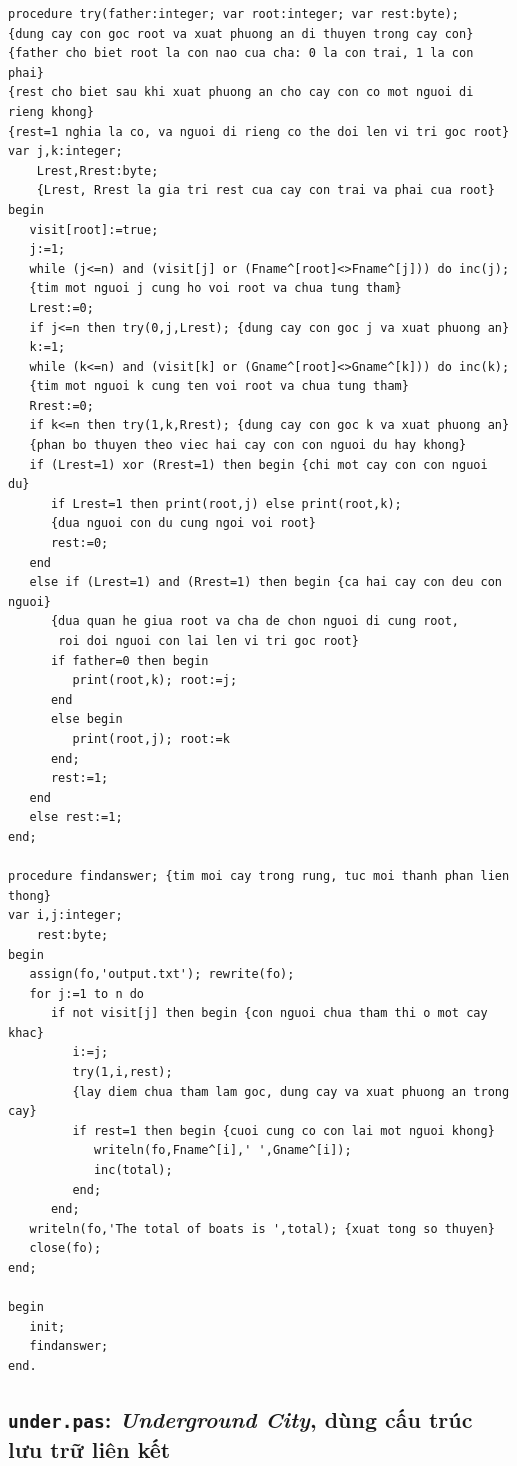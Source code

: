 \documentclass[11pt]{article}
\begin{document}
\begin{verbatim}
procedure try(father:integer; var root:integer; var rest:byte);
{dung cay con goc root va xuat phuong an di thuyen trong cay con}
{father cho biet root la con nao cua cha: 0 la con trai, 1 la con phai}
{rest cho biet sau khi xuat phuong an cho cay con co mot nguoi di rieng khong}
{rest=1 nghia la co, va nguoi di rieng co the doi len vi tri goc root}
var j,k:integer;
    Lrest,Rrest:byte;
    {Lrest, Rrest la gia tri rest cua cay con trai va phai cua root}
begin
   visit[root]:=true;
   j:=1;
   while (j<=n) and (visit[j] or (Fname^[root]<>Fname^[j])) do inc(j);
   {tim mot nguoi j cung ho voi root va chua tung tham}
   Lrest:=0;
   if j<=n then try(0,j,Lrest); {dung cay con goc j va xuat phuong an}
   k:=1;
   while (k<=n) and (visit[k] or (Gname^[root]<>Gname^[k])) do inc(k);
   {tim mot nguoi k cung ten voi root va chua tung tham}
   Rrest:=0;
   if k<=n then try(1,k,Rrest); {dung cay con goc k va xuat phuong an}
   {phan bo thuyen theo viec hai cay con con nguoi du hay khong}
   if (Lrest=1) xor (Rrest=1) then begin {chi mot cay con con nguoi du}
      if Lrest=1 then print(root,j) else print(root,k);
      {dua nguoi con du cung ngoi voi root}
      rest:=0;
   end
   else if (Lrest=1) and (Rrest=1) then begin {ca hai cay con deu con nguoi}
      {dua quan he giua root va cha de chon nguoi di cung root,
       roi doi nguoi con lai len vi tri goc root}
      if father=0 then begin
         print(root,k); root:=j;
      end
      else begin
         print(root,j); root:=k
      end;
      rest:=1;
   end
   else rest:=1;
end;

procedure findanswer; {tim moi cay trong rung, tuc moi thanh phan lien thong}
var i,j:integer;
    rest:byte;
begin
   assign(fo,'output.txt'); rewrite(fo);
   for j:=1 to n do
      if not visit[j] then begin {con nguoi chua tham thi o mot cay khac}
         i:=j;
         try(1,i,rest);
         {lay diem chua tham lam goc, dung cay va xuat phuong an trong cay}
         if rest=1 then begin {cuoi cung co con lai mot nguoi khong}
            writeln(fo,Fname^[i],' ',Gname^[i]);
            inc(total);
         end;
      end;
   writeln(fo,'The total of boats is ',total); {xuat tong so thuyen}
   close(fo);
end;

begin
   init;
   findanswer;
end.
\end{verbatim}

\subsection{\texttt{under.pas}: \textit{Underground City}, dùng cấu trúc lưu trữ liên kết}
\end{document}
